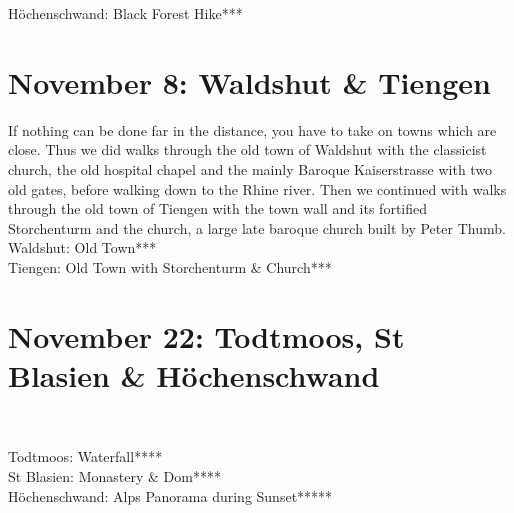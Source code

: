 H\"ochenschwand: Black Forest Hike***

\section{November 8: Waldshut \& Tiengen}
\label{2021WaldshutTiengen}

If nothing can be done far in the distance, you have to take on towns which are close. Thus we did walks through the old town of Waldshut with the classicist church, the old hospital chapel and the mainly Baroque Kaiserstrasse with two old gates, before walking down to the Rhine river. Then we continued with walks through the old town of Tiengen with the town wall and its fortified Storchenturm and the church, a large late baroque church built by Peter Thumb.\\

Waldshut: Old Town***\\
Tiengen: Old Town with Storchenturm \& Church***\\

\section{November 22: Todtmoos, St Blasien \& H\"ochenschwand}\
\label{2021:Todtmoos}

Todtmoos: Waterfall****\\
St Blasien: Monastery \& Dom****\\
H\"ochenschwand: Alps Panorama during Sunset*****\\

